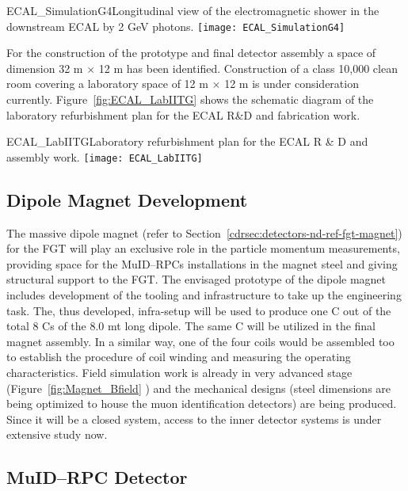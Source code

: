\begin{cdrfigure}  
{ECAL_SimulationG4}{Longitudinal view of the electromagnetic shower in the downstream ECAL by 2 GeV photons.}  
\texttt{[image: ECAL\_SimulationG4]}
\end{cdrfigure}

For the construction of the prototype and final detector assembly a space of dimension 32 m $\times$ 12 m 
has been identified. Construction of a class 10,000 clean room covering a laboratory space of 
12 m $\times$ 12 m is under consideration currently. Figure~\ref{fig:ECAL_LabIITG} shows the schematic 
diagram of the laboratory refurbishment plan for the ECAL R\&D and fabrication work. 

\begin{cdrfigure}  
{ECAL_LabIITG}{Laboratory refurbishment plan for the ECAL R \& D and assembly work.}  
\texttt{[image: ECAL\_LabIITG]}
\end{cdrfigure}


\subsection{Dipole Magnet Development} 

The massive dipole magnet (refer to Section~\ref{cdrsec:detectors-nd-ref-fgt-magnet}) for the FGT 
will play an exclusive role in the particle momentum measurements, providing space for the MuID--RPCs 
installations in the magnet steel and giving structural support to the FGT. The envisaged prototype of 
the dipole magnet includes development of the tooling and infrastructure to take up the engineering task. 
The, thus developed, infra-setup will be used to produce one C out of the total 8 Cs of the 8.0 mt long dipole. 
The same C will be utilized in the final magnet assembly. In a similar way, one of the four coils 
would be assembled too to establish the procedure of coil winding and measuring the operating characteristics. 
Field simulation work is already in very advanced stage (Figure~\ref{fig:Magnet_Bfield} ) and the mechanical 
designs (steel dimensions are being optimized to house the muon identification detectors) are being produced. 
Since it will be a closed system, access to the inner detector systems is under extensive study now. 




\subsection{MuID--RPC Detector}   


